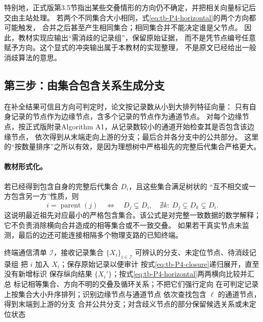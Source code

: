 \documentclass[UTF8,11pt,fontset=fandol,openany,oneside]{ctexbook}
\theoremstyle{definition}
\theoremstyle{remark}
\numberwithin{equation}{chapter}
\begin{document}
特别地，正式版第3.5节指出某些交叠情形的方向仍不确定，并把相关向量标记后交由主站处理。
若两个不同集合大小相同，式\eqref{eq:tb-P4-horizontal}的两个方向都可能触发，
合并之后甚至产生相同集合；相同集合并不能决定谁是父节点。
因此，教材实现应输出“需消歧的记录组”，保留原始证据，
而不是凭节点编号任意赋予方向。这个显式的冲突输出属于本教材的实现整理，
不是原文已经给出一般消歧算法的意思。

\subsection{第三步：由集合包含关系生成分支}
在补全结果可信且方向可判定时，论文按记录数从小到大排列特征向量：
只有自身记录的节点作为边缘节点，含多个记录的节点作为通道节点。
对每个边缘节点，按正式版附录Algorithm A1，从记录数较小的通道开始检查其是否包含该边缘节点，
依次得到从末端走向上游的分支；最后合并各分支中的公共部分。
这里的“按数量排序”之所以有效，是因为理想树中严格祖先的完整后代集合严格更大。

\paragraph{教材形式化。}
若已经得到包含自身的完整后代集合 $D_i$，且这些集合满足树状的
“互不相交或一方包含另一方”性质，则
\[
 i=\operatorname{parent}(j)
 \quad\Longleftrightarrow\quad
 D_j\subsetneq D_i,\quad
 \nexists k:\ D_j\subsetneq D_k\subsetneq D_i.
\]
这说明最近祖先对应最小的严格包含集合。该公式是对完整一致数据的数学解释；
它不负责消除横向合并造成的相等集合或不一致交叠。
如果若干真实节点未监测，最后的边还可能连接相隔多个物理支路的已知终端。

\begin{algorithm}[htbp]
\caption{P4 的记录整理主线；歧义与一致性检查为教材显式补充}
\label{alg:tb-P4}
\begin{algorithmic}[1]
\Require 终端通信清单 $\mathcal I$，接收记录集合 $\{X_i\}_{i\in\mathcal I}$
\Ensure 可辨认的分支、未定位节点、待消歧记录组
 \State 把 $i$ 加入 $X_i$；保存原始记录以便审计
\EndFor
\State 按式\eqref{eq:tb-P4-closure}递归展开，直至没有新增标识
\State 保存纵向结果 $\{X_i'\}$；按式\eqref{eq:tb-P4-horizontal}两两横向比较并汇总
\State 标记相等集合、方向不明的交叠及循环关系；不把它们强行定向
\State 在可判定记录上按集合大小升序排列；识别边缘节点与通道节点
 \State 依次查找包含 $\ell$ 的通道节点，得到末端到上游的分支
\EndFor
\State 合并公共分支；对含歧义节点的部分保留候选关系或未定位状态
\end{algorithmic}
\end{algorithm}
\end{document}
